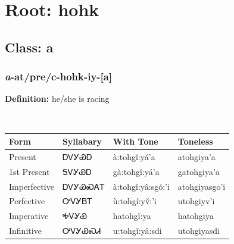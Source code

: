 \needspace{4in}
\section*{Root: hohk}
\nopagebreak
{}
\needspace{3in}
\subsection*{Class: a}
\nopagebreak
\needspace{2in}
\subsubsection*{\textit{a}{-}at/pre/c{-}\textbf{hohk}{-}iy{-}[a]}
\nopagebreak
\textbf{Definition: } he/she is racing
\\[0.5em]
\begin{tabularx}{\textwidth}{l X X X}%
\toprule%
\textbf{Form}&\textbf{Syllabary}&\textbf{With Tone}&\textbf{Toneless}\\%
\midrule%
Present&ᎠᏙᎩᏯᎠ&à:tohgǐ:yá’a&atohgiya’a\\%
1st Present&ᎦᏙᎩᏯᎠ&gà:tohgǐ:yá’a&gatohgiya’a\\%
Imperfective&ᎠᏙᎩᏯᏍᎪᎢ&à:tohgǐ:yâ:sgó:’i&atohgiyasgo’i\\%
Perfective&ᎤᏙᎩᏴᎢ&ù:tohgí:yv̌:’i&utohgiyv’i\\%
Imperative&ᎭᏙᎩᏯ&hatohgǐ:ya&hatohgiya\\%
Infinitive&ᎤᏙᎩᏯᏍᏗ&u:tohgǐ:yâ:sdi&utohgiyasdi\\%
\bottomrule%
\end{tabularx}
\\[1em]